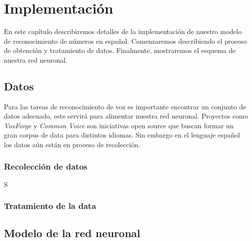 \chapter{Implementación}
En este capítulo describiremos detalles de la implementación de nuestro modelo de reconocimiento de números en español. Comenzaremos describiendo el proceso de obtención y tratamiento de datos. Finalmente, mostraremos el esquema de nuestra red neuronal.

\section{Datos}
Para las tareas de reconocimiento de voz es importante encontrar un conjunto de datos adecuado, este servirá para alimentar nuestra red neuronal. Proyectos como \textit{VoxForge}\cite{WEBSITE:21} y \textit{Common Voice}\cite{WEBSITE:22} son iniciativas open source que buscan formar un gran corpus de data para distintos idiomas. Sin embargo en el lenguaje español los datos aún están en proceso de recolección.
\subsection{Recolección de datos}
S
\subsection{Tratamiento de la data}
\section{Modelo de la red neuronal}